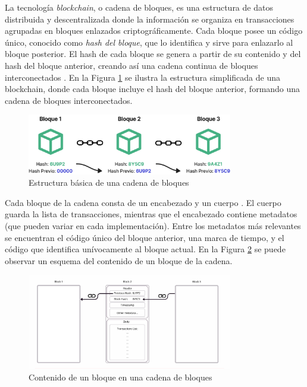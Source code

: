 La tecnología \textit{blockchain}, o cadena de bloques, es una estructura de datos distribuida y descentralizada donde la información se organiza en transacciones agrupadas en bloques enlazados criptográficamente. Cada bloque posee un código único, conocido como \textit{hash del bloque}, que lo identifica y sirve para enlazarlo al bloque posterior. El hash de cada bloque se genera a partir de su contenido y del hash del bloque anterior, creando así una cadena continua de bloques interconectados \cite{tripathi2023comprehensive}. En la Figura \ref{fig:blockchain-basic} se ilustra la estructura simplificada de una blockchain, donde cada bloque incluye el hash del bloque anterior, formando una cadena de bloques interconectados.

\begin{figure}[!tb]
    \centering
    \includegraphics[width=0.8\textwidth]{Figures/blockchain-basic.png}
    \caption{Estructura básica de una cadena de bloques}
    \label{fig:blockchain-basic}
\end{figure}

Cada bloque de la cadena consta de un encabezado y un cuerpo \cite{tripathi2023comprehensive}. El cuerpo guarda la lista de transacciones, mientras que el encabezado contiene metadatos (que pueden variar en cada implementación). Entre los metadatos más relevantes se encuentran el código único del bloque anterior, una marca de tiempo, y el código que identifica unívocamente al bloque actual. En la Figura \ref{fig:block-structure} se puede observar un esquema del contenido de un bloque de la cadena.

\begin{figure}[!tb]
    \centering
    \includegraphics[width=0.8\textwidth]{Figures/block-structure.png}
    \caption{Contenido de un bloque en una cadena de bloques}
    \label{fig:block-structure}
\end{figure}

